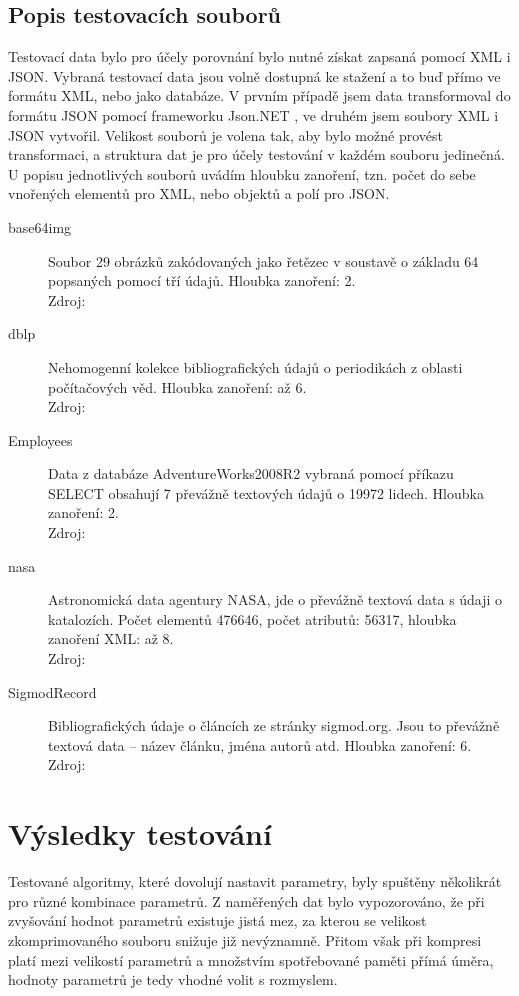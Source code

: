 \subsection{Popis testovacích souborů}
Testovací data bylo pro účely porovnání bylo nutné získat zapsaná pomocí XML i JSON. Vybraná testovací data jsou volně dostupná ke stažení a to buď přímo ve formátu XML, nebo jako databáze. V prvním případě jsem data transformoval do formátu JSON pomocí frameworku Json.NET \cite{jsonNET}, ve druhém jsem soubory XML i JSON vytvořil. Velikost souborů je volena tak, aby bylo možné provést transformaci, a struktura dat je pro účely testování v každém souboru jedinečná. U popisu jednotlivých souborů uvádím hloubku zanoření, tzn. počet do sebe vnořených elementů pro XML, nebo objektů a polí pro JSON.

\begin{description}
\item[base64img]Soubor 29 obrázků zakódovaných jako řetězec v soustavě o základu 64 popsaných pomocí tří údajů. Hloubka zanoření: 2.\\
Zdroj: %
\item[dblp]
Nehomogenní kolekce bibliografických údajů o periodikách z oblasti počítačových věd. Hloubka zanoření: až 6.\\
Zdroj: %
\item[Employees]
Data z databáze AdventureWorks2008R2 vybraná pomocí příkazu SELECT obsahují 7 převážně textových údajů o 19972 lidech. Hloubka zanoření: 2.\\
Zdroj: %
\item[nasa]
Astronomická data agentury NASA, jde o převážně textová data s údaji o katalozích. Počet elementů 476646, počet atributů: 56317, hloubka zanoření XML: až 8.\\
Zdroj: %
\item[SigmodRecord]
Bibliografických údaje o článcích ze stránky sigmod.org. Jsou to převážně textová data -- název článku, jména autorů atd. Hloubka zanoření: 6.\\
Zdroj: %
\end{description}

\section{Výsledky testování}
Testované algoritmy, které dovolují nastavit parametry, byly spuštěny několikrát pro různé kombinace parametrů. Z naměřených dat bylo vypozorováno, že při zvyšování hodnot parametrů existuje jistá mez, za kterou se velikost zkomprimovaného souboru snižuje již nevýznamně. Přitom však při kompresi platí mezi velikostí parametrů a množstvím spotřebované paměti přímá úměra, hodnoty parametrů je tedy vhodné volit s rozmyslem.

